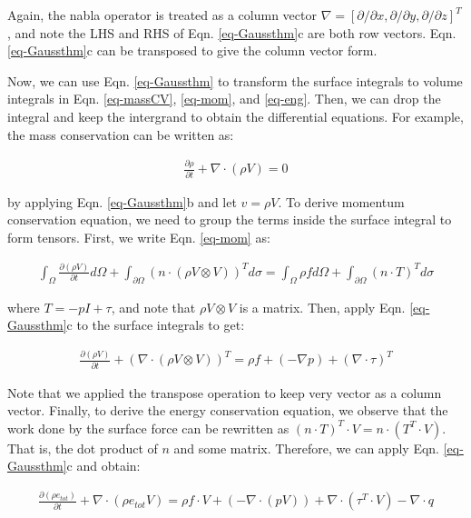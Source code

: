 \documentclass[12pt, letterpaper]{report}
\begin{document}
Again, the nabla operator is treated as a column vector $\nabla = [\partial/\partial x,
\partial/\partial y, \partial/\partial z]^T$, and note the LHS and RHS of Eqn. \ref{eq-Gaussthm}c
are both row vectors. Eqn. \ref{eq-Gaussthm}c can be transposed to give the column vector form.
\paraspace

Now, we can use Eqn. \ref{eq-Gaussthm} to transform the surface integrals to volume integrals in
Eqn. \ref{eq-massCV}, \ref{eq-mom}, and \ref{eq-eng}. Then, we can drop the integral and keep the
intergrand to obtain the differential equations. For example, the mass conservation can be written
as:

\begin{align}\label{eq-massDf}
   \frac{\partial \rho}{\partial t} + \nabla \cdot (\rho V) = 0
\end{align}

by applying Eqn. \ref{eq-Gaussthm}b and let $v = \rho V$. To derive momentum conservation equation,
we need to group the terms inside the surface integral to form tensors. First, we write Eqn.
\ref{eq-mom} as:

\begin{align}\label{eq-momTs}
   \int_\Omega \frac{\partial(\rho V)}{\partial t}d\Omega + \int_{\partial\Omega} \left(n \cdot (\rho
   V \mathop{\otimes} V)\right)^T d\sigma = \int_\Omega \rho f d\Omega + \int_{\partial\Omega} (n
   \cdot T)^T d\sigma
\end{align}

where $T = -pI + \tau$, and note that $\rho V \mathop{\otimes} V$ is a matrix. Then, apply Eqn.
\ref{eq-Gaussthm}c to the surface integrals to get:

\begin{align}\label{eq-momDf}
   \frac{\partial (\rho V)}{\partial t} + \left(\nabla \cdot (\rho V \mathop{\otimes} V)\right)^T = \rho f
   + (-\nabla p) + (\nabla \cdot \tau)^T
\end{align}

Note that we applied the transpose operation to keep very vector as a column vector. Finally, to
derive the energy conservation equation, we observe that the work done by the surface force can be
rewritten as $(n \cdot T)^T \cdot V = n \cdot (T^T \cdot V)$. That is, the dot product of $n$ and
some matrix. Therefore, we can apply Eqn. \ref{eq-Gaussthm}c and obtain:

\begin{align}\label{eq-engDf}
   \frac{\partial (\rho e_{tot})}{\partial t} + \nabla \cdot (\rho e_{tot} V) = \rho f \cdot V +
   (-\nabla \cdot (pV)) + \nabla \cdot (\tau^T \cdot V) - \nabla \cdot q
\end{align}
\end{document}
